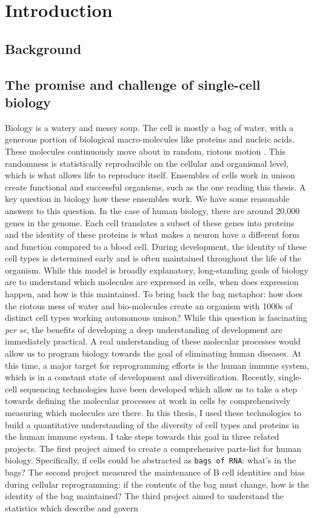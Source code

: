 \chapter{Introduction}

\section{Background}

\section{The promise and challenge of single-cell biology}

Biology is a watery and messy soup. The cell is mostly a bag of water, with a generous portion of biological macro-molecules like proteins and nucleic acids. These molecules continuously move about in random, riotous motion \cite{berg1993random}. This randomness is statistically reproducible on the cellular and organismal level, which is what allows life to reproduce itself. Ensembles of cells work in unison create functional and successful organisms, such as the one reading this thesis. A key question in biology how these ensembles work. We have some reasonable answers to this question. In the case of human biology, there are around 20,000 genes in the genome. Each cell translates a subset of these genes into proteins and the identity of these proteins is what makes a neuron have a different form and function compared to a blood cell. During development, the identity of these cell types is determined early and is often maintained throughout the life of the organism. While this model is broadly explanatory, long-standing goals of biology are to understand which molecules are expressed in cells, when does expression happen, and how is this maintained. To bring back the bag metaphor: how does the riotous mess of water and bio-molecules create an organism with 1000s of distinct cell types working autonomous unison? While this question is fascinating \textit{per se}, the benefits of developing a deep understanding of development are immediately practical. A real understanding of these molecular processes would allow us to program biology towards the goal of eliminating human diseases. At this time, a major target for reprogramming efforts is the human immune system, which is in a constant state of development and diversification. Recently, single-cell sequencing technologies have been developed which allow us to take a step towards defining the molecular processes at work in cells by comprehensively measuring which molecules are there. In this thesis, I used these technologies to build a quantitative understanding of the diversity of cell types and proteins in the human immune system. I take steps towards this goal in three related projects. The first project aimed to create a comprehensive parts-list for human biology. Specifically, if cells could be abstracted as \verb|bags of RNA|\cite{quake2021cell}: what's in the bags?  The second project measured the maintenance of B cell identities and bias during cellular reprogramming: if the contents of the bag must change, how is the identity of the bag maintained? The third project aimed to understand the statistics which describe and govern 